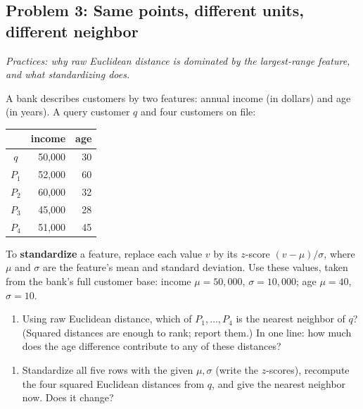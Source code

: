 \documentclass[
  11pt,
]{article}
\providecommand{\tightlist}{%
  \setlength{\itemsep}{0pt}\setlength{\parskip}{0pt}}
\newcommand{\answerpage}{\clearpage}
\begin{document}
\answerpage

\subsection{Problem 3: Same points, different units, different
neighbor}\label{problem-3-same-points-different-units-different-neighbor}

\emph{Practices: why raw Euclidean distance is dominated by the
largest-range feature, and what standardizing does.}

A bank describes customers by two features: annual income (in dollars)
and age (in years). A query customer \(q\) and four customers on file:

\begin{longtable}[]{@{}crr@{}}
\toprule\noalign{}
& income & age \\
\midrule\noalign{}
\endhead
\bottomrule\noalign{}
\endlastfoot
\(q\) & 50,000 & 30 \\
\(P_1\) & 52,000 & 60 \\
\(P_2\) & 60,000 & 32 \\
\(P_3\) & 45,000 & 28 \\
\(P_4\) & 51,000 & 45 \\
\end{longtable}

To \textbf{standardize} a feature, replace each value \(v\) by its
\(z\)-score \((v-\mu)/\sigma\), where \(\mu\) and \(\sigma\) are the
feature's mean and standard deviation. Use these values, taken from the
bank's full customer base: income \(\mu = 50{,}000\),
\(\sigma = 10{,}000\); age \(\mu = 40\), \(\sigma = 10\).

\begin{enumerate}
\def\labelenumi{(\alph{enumi})}
\tightlist
\item
  Using raw Euclidean distance, which of \(P_1,\dots,P_4\) is the
  nearest neighbor of \(q\)? (Squared distances are enough to rank;
  report them.) In one line: how much does the age difference contribute
  to any of these distances?
\end{enumerate}

\begin{enumerate}
\def\labelenumi{(\alph{enumi})}
\setcounter{enumi}{1}
\tightlist
\item
  Standardize all five rows with the given \(\mu,\sigma\) (write the
  \(z\)-scores), recompute the four squared Euclidean distances from
  \(q\), and give the nearest neighbor now. Does it change?
\end{enumerate}
\end{document}
